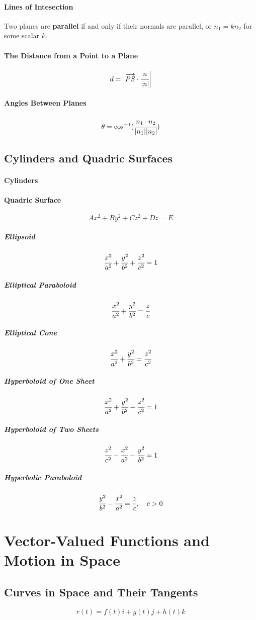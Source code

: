 \documentclass{article}
\begin{document}
            \paragraph{Lines of Intesection}
                Two planes are \textbf{parallel} if and only if their normals are parallel, or $n_1=kn_2$ for some scalar $k$.
            \paragraph{The Distance from a Point to a Plane}
                \[d=\bigg|\overrightarrow{PS}\cdot\cfrac{n}{|n|}\bigg|\]
            \paragraph{Angles Between Planes}
                \[\theta =\cos^{-1}(\cfrac{n_1\cdot n_2}{|n_1||n_2|})\]
        \subsection{Cylinders and Quadric Surfaces}
            \paragraph{Cylinders}
            \paragraph{Quadric Surface}
                \[Ax^2+By^2+Cz^2+Dz=E\]
                \subparagraph{Ellipsoid}
                    \[\cfrac{x^2}{a^2}+\cfrac{y^2}{b^2}+\cfrac{z^2}{c^2}=1\]
                \subparagraph{Elliptical Paraboloid}
                    \[\cfrac{x^2}{a^2}+\cfrac{y^2}{b^2}=\cfrac{z}{c}\]
                \subparagraph{Elliptical Cone}
                    \[\cfrac{x^2}{a^2}+\cfrac{y^2}{b^2}=\cfrac{z^2}{c^2}\]
                \subparagraph{Hyperboloid of One Sheet}
                    \[\cfrac{x^2}{a^2}+\cfrac{y^2}{b^2}-\cfrac{z^2}{c^2}=1\]
                \subparagraph{Hyperboloid of Two Sheets}
                    \[\cfrac{z^2}{c^2}-\cfrac{x^2}{a^2}-\cfrac{y^2}{b^2}=1\]
                \subparagraph{Hyperbolic Paraboloid}
                    \[\cfrac{y^2}{b^2}-\cfrac{x^2}{a^2}=\cfrac{z}{c},\quad c>0\]
    
    \newpage
    \section{Vector-Valued Functions and Motion in Space}
        \subsection{Curves in Space and Their Tangents}
            \[r(t)=f(t)i+g(t)j+h(t)k\]
\end{document}
